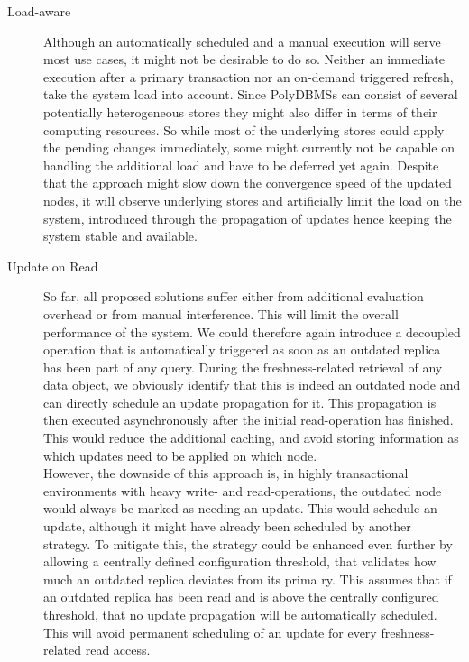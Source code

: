 \begin{description}
    \item[Load-aware] Although an automatically scheduled and a manual execution will serve most use cases, it might not be desirable to do so.
    Neither an immediate execution after a primary transaction nor an on-demand triggered refresh, take the system load into account.
    Since PolyDBMSs can consist of several potentially heterogeneous stores they might also differ in terms of their computing resources.
    So while most of the underlying stores could apply the pending changes immediately, some might currently not be capable on handling the additional load and have to 
    be deferred yet again. Despite that the approach might slow down the convergence speed of the updated nodes, 
    it will observe underlying stores and artificially limit the load on the system, introduced through the propagation of updates hence keeping the system stable and available.

    \item[Update on Read] So far, all proposed solutions suffer either from additional evaluation overhead or from manual interference. This will limit the overall 
    performance of the system. We could therefore again introduce a decoupled operation that is automatically triggered as soon as an outdated replica has been part of any query. 
    During the freshness-related retrieval of any data object, we obviously identify that this is indeed an outdated node and can directly schedule an update propagation for it. This propagation is then
    executed asynchronously after the initial read-operation has finished. This would reduce the additional caching, and avoid storing 
    information as which updates need to be applied on which node.\\
    However, the downside of this approach is, in highly transactional environments with heavy write- and read-operations, the outdated node would always be marked as 
    needing an update. This would schedule an update, although it might have already been scheduled by another strategy. 
    To mitigate this, the strategy could be enhanced even further by allowing a centrally defined configuration threshold, that validates how much an outdated replica deviates from its prima
    ry. 
    This assumes that if an outdated replica has been read and is above the centrally configured threshold, that no update propagation will be automatically scheduled.
    This will avoid permanent scheduling of an update for every freshness-related read access.

\end{description}






